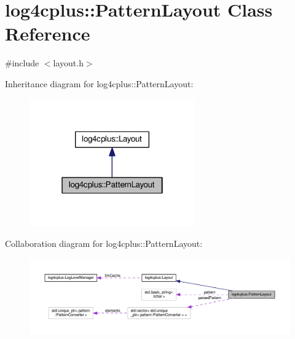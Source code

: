 \hypertarget{classlog4cplus_1_1PatternLayout}{\section{log4cplus\-:\-:Pattern\-Layout Class Reference}
\label{classlog4cplus_1_1PatternLayout}
}


{\ttfamily \#include $<$layout.\-h$>$}



Inheritance diagram for log4cplus\-:\-:Pattern\-Layout\-:
\nopagebreak
\begin{figure}[H]
\begin{center}
\leavevmode
\includegraphics[width=202pt]{classlog4cplus_1_1PatternLayout__inherit__graph}
\end{center}
\end{figure}


Collaboration diagram for log4cplus\-:\-:Pattern\-Layout\-:
\nopagebreak
\begin{figure}[H]
\begin{center}
\leavevmode
\includegraphics[width=350pt]{classlog4cplus_1_1PatternLayout__coll__graph}
\end{center}
\end{figure}
